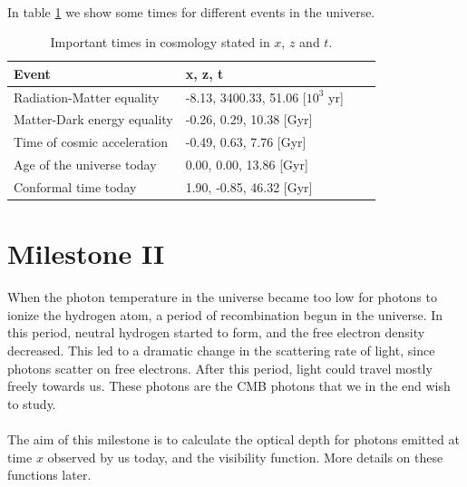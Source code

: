 \documentclass{aa}
\begin{document}
\noindent
\\
In table \ref{tab:M1_times} we show some times for different events in the universe.
\begin{table} %
     \caption{Important times in cosmology stated in $x$, $z$ and $t$.} %
     \label{tab:M1_times}
     \begin{tabular}{l|l|r|l} %
       \textbf{Event} & \textbf{x, z, t}\\ %
       \hline %
       Radiation-Matter equality & -8.13,  3400.33, 51.06 [$10^3$ yr] \\
       Matter-Dark energy equality & -0.26, 0.29, 10.38 [Gyr]        \\
       Time of cosmic acceleration & -0.49, 0.63, 7.76 [Gyr]\\
       Age of the universe today & 0.00, 0.00, 13.86 [Gyr]  \\
       Conformal time today  & 1.90, -0.85, 46.32 [Gyr]\\

       \hline
     \end{tabular}
 \end{table}



\section{Milestone II}
When the photon temperature in the universe became too low for photons to ionize the hydrogen atom, a period of recombination begun in the universe. In this period, neutral hydrogen
started to form, and the free electron density decreased. This led to a dramatic change in the scattering rate of light, since photons scatter on free electrons. After this period, light could travel mostly freely towards us. These 
photons are the CMB photons that we in the end wish to study.\\
\\  
The aim of this milestone is to calculate the optical depth for photons emitted at time $x$ observed by us today, and the visibility function. More details on these functions later. 
\end{document}

